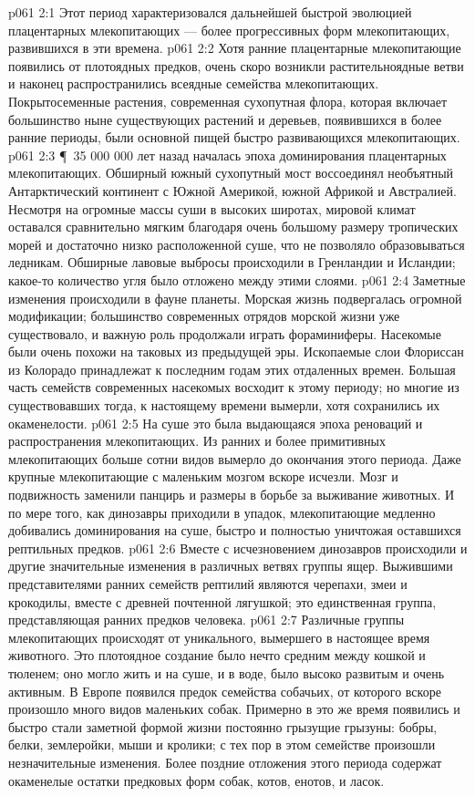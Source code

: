 \vs p061 2:1 Этот период характеризовался дальнейшей быстрой эволюцией плацентарных млекопитающих --- более прогрессивных форм млекопитающих, развившихся в эти времена.
\vs p061 2:2 Хотя ранние плацентарные млекопитающие появились от плотоядных предков, очень скоро возникли растительноядные ветви и наконец распространились всеядные семейства млекопитающих. Покрытосеменные растения, современная сухопутная флора, которая включает большинство ныне существующих растений и деревьев, появившихся в более ранние периоды, были основной пищей быстро развивающихся млекопитающих.
\vs p061 2:3 \P\ 35 000 000 лет назад началась эпоха доминирования плацентарных млекопитающих. Обширный южный сухопутный мост воссоединял необъятный Антарктический континент с Южной Америкой, южной Африкой и Австралией. Несмотря на огромные массы суши в высоких широтах, мировой климат оставался сравнительно мягким благодаря очень большому размеру тропических морей и достаточно низко расположенной суше, что не позволяло образовываться ледникам. Обширные лавовые выбросы происходили в Гренландии и Исландии; какое\hyp{}то количество угля было отложено между этими слоями.
\vs p061 2:4 Заметные изменения происходили в фауне планеты. Морская жизнь подвергалась огромной модификации; большинство современных отрядов морской жизни уже существовало, и важную роль продолжали играть фораминиферы. Насекомые были очень похожи на таковых из предыдущей эры. Ископаемые слои Флориссан из Колорадо принадлежат к последним годам этих отдаленных времен. Большая часть семейств современных насекомых восходит к этому периоду; но многие из существовавших тогда, к настоящему времени вымерли, хотя сохранились их окаменелости.
\vs p061 2:5 На суше это была выдающаяся эпоха реноваций и распространения млекопитающих. Из ранних и более примитивных млекопитающих больше сотни видов вымерло до окончания этого периода. Даже крупные млекопитающие с маленьким мозгом вскоре исчезли. Мозг и подвижность заменили панцирь и размеры в борьбе за выживание животных. И по мере того, как динозавры приходили в упадок, млекопитающие медленно добивались доминирования на суше, быстро и полностью уничтожая оставшихся рептильных предков.
\vs p061 2:6 Вместе с исчезновением динозавров происходили и другие значительные изменения в различных ветвях группы ящер. Выжившими представителями ранних семейств рептилий являются черепахи, змеи и крокодилы, вместе с древней почтенной лягушкой; это единственная группа, представляющая ранних предков человека.
\vs p061 2:7 Различные группы млекопитающих происходят от уникального, вымершего в настоящее время животного. Это плотоядное создание было нечто средним между кошкой и тюленем; оно могло жить и на суше, и в воде, было высоко развитым и очень активным. В Европе появился предок семейства собачьих, от которого вскоре произошло много видов маленьких собак. Примерно в это же время появились и быстро стали заметной формой жизни постоянно грызущие грызуны: бобры, белки, землеройки, мыши и кролики; с тех пор в этом семействе произошли незначительные изменения. Более поздние отложения этого периода содержат окаменелые остатки предковых форм собак, котов, енотов, и ласок.
